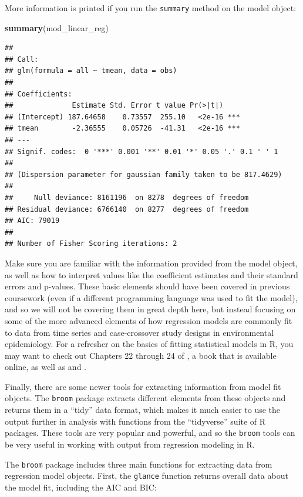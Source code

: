 \documentclass[
]{book}
\newenvironment{Shaded}{\begin{snugshade}}{\end{snugshade}}
\newcommand{\FunctionTok}[1]{\textcolor[rgb]{0.13,0.29,0.53}{\textbf{#1}}}
\newcommand{\NormalTok}[1]{#1}
\begin{document}
More information is printed if you run the \texttt{summary} method on the model
object:

\begin{Shaded}
\begin{Highlighting}[]
\FunctionTok{summary}\NormalTok{(mod\_linear\_reg)}
\end{Highlighting}
\end{Shaded}

\begin{verbatim}
## 
## Call:
## glm(formula = all ~ tmean, data = obs)
## 
## Coefficients:
##              Estimate Std. Error t value Pr(>|t|)    
## (Intercept) 187.64658    0.73557  255.10   <2e-16 ***
## tmean        -2.36555    0.05726  -41.31   <2e-16 ***
## ---
## Signif. codes:  0 '***' 0.001 '**' 0.01 '*' 0.05 '.' 0.1 ' ' 1
## 
## (Dispersion parameter for gaussian family taken to be 817.4629)
## 
##     Null deviance: 8161196  on 8278  degrees of freedom
## Residual deviance: 6766140  on 8277  degrees of freedom
## AIC: 79019
## 
## Number of Fisher Scoring iterations: 2
\end{verbatim}

Make sure you are familiar with the information provided from the model object,
as well as how to interpret values like the coefficient estimates and their
standard errors and p-values. These basic elements should have been covered in
previous coursework (even if a different programming language was used to fit
the model), and so we will not be covering them in great depth here, but instead
focusing on some of the more advanced elements of how regression models are
commonly fit to data from time series and case-crossover study designs in
environmental epidemiology. For a refresher on the basics of fitting
statistical models in R, you may want to check out Chapters 22 through 24 of
\citet{wickham2016r}, a book that is available online, as well as \citet{dunn2018generalized1} and
\citet{james2013introduction3} .

Finally, there are some newer tools for extracting information from model fit
objects. The \texttt{broom} package extracts different elements from these objects
and returns them in a ``tidy'' data format, which makes it much easier to use
the output further in analysis with functions from the ``tidyverse'' suite of
R packages. These tools are very popular and powerful, and so the \texttt{broom} tools
can be very useful in working with output from regression modeling in R.

The \texttt{broom} package includes three main functions for extracting data from
regression model objects. First, the \texttt{glance} function returns overall data
about the model fit, including the AIC and BIC:
\end{document}
